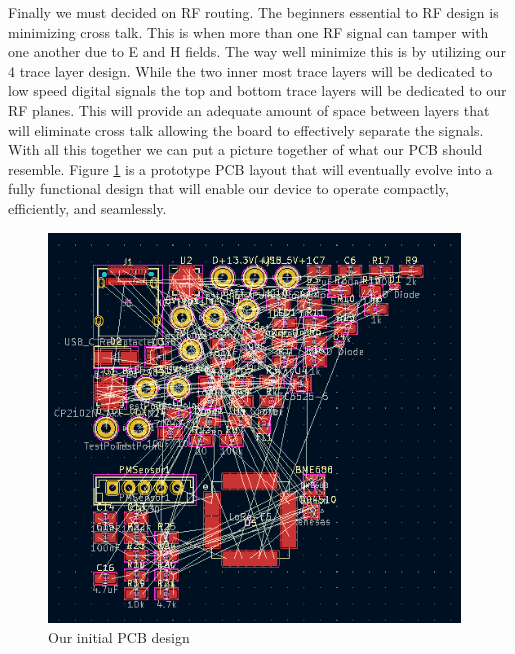 Finally we must decided on RF routing. The beginners essential to RF design is minimizing cross talk. This is when more than one RF signal can tamper with one another due to E and H fields. The way well minimize this is by utilizing our 4 trace layer design. While the two inner most trace layers will be dedicated to low speed digital signals the top and bottom trace layers will be dedicated to our RF planes. This will provide an adequate amount of space between layers that will eliminate cross talk allowing the board to effectively separate the signals. With all this together we can put a picture together of what our PCB should resemble. Figure \ref{fig:PCB} is a prototype PCB layout that will eventually evolve into a fully functional design that will enable our device to operate compactly, efficiently, and seamlessly.

\begin{figure}
    \centering
    \includegraphics[width=4.3in]{figures/PCB.png}
    \caption{Our initial PCB design}
    \label{fig:PCB} 
\end{figure}


